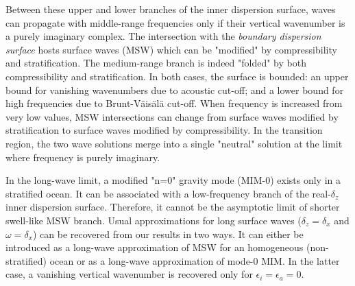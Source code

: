 Between these upper and lower branches of the inner dispersion surface, waves can propagate with middle-range frequencies only if their vertical wavenumber is a purely imaginary complex. The intersection with the \textit{boundary dispersion surface} hosts surface waves (MSW) which can be "modified" by compressibility and stratification. The medium-range branch is indeed "folded" by both compressibility and stratification. In both cases, the surface is bounded: an upper bound for vanishing wavenumbers due to acoustic cut-off; and a lower bound for high frequencies due to Brunt-Väisälä cut-off. When frequency is increased from very low values, MSW intersections can change from surface waves modified by stratification to surface waves modified by compressibility. In the transition region, the two wave solutions merge into a single "neutral" solution at the limit where frequency is purely imaginary.

In the long-wave limit, a modified "n=0" gravity mode (MIM-0) exists only in a stratified ocean. It can be associated with a low-frequency branch of the real-$\delta_z$ inner dispersion surface. Therefore, it cannot be the asymptotic limit of shorter swell-like MSW branch. Usual approximations for long surface waves ($\delta_z=\delta_x$ and $\omega=\delta_x$) can be recovered from our results in two ways. It can either be introduced as a long-wave approximation of MSW for an homogeneous (non-stratified) ocean or as a long-wave approximation of mode-0 MIM. In the latter case, a vanishing vertical wavenumber is recovered only for $\epsilon_i=\epsilon_a=0$.

